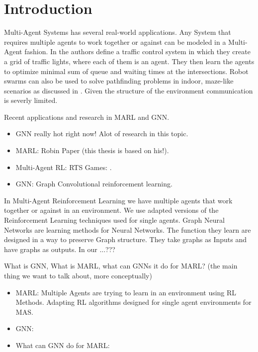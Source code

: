 
\chapter{Introduction}
Multi-Agent Systems has several real-world applications. Any System that requires multiple agents to work together or against can be modeled in a Multi-Agent fashion. In \citet{MARLTraffic2020} the authors define a traffic control system in which they create a grid of traffic lights, where each of them is an agent. They then learn the agents to optimize minimal sum of queue and waiting times at the intersections. Robot swarms can also be used to solve pathfinding problems in indoor, maze-like scenarios as discussed in \citet{SwarmPathFinding2013}. Given the structure of the environment communication is severly limited. 
\par

Recent applications and research in MARL and GNN.
\begin{itemize}[noitemsep,nolistsep]
	\item GNN really hot right now! Alot of research in this topic.
	\item MARL: Robin Paper (this thesis is based on his!). 
	\item Multi-Agent RL: RTS Games: \citet{RTSMARL2021}.
	\item GNN: Graph Convolutional reinforcement learning.
\end{itemize} \par

In Multi-Agent Reinforcement Learning we have multiple agents that work together or against in an environment. We use adapted versions of the Reinforcement Learning techniques used for single agents. Graph Neural Networks are learning methods for Neural Networks. The function they learn are designed in a way to preserve Graph structure. They take graphs as Inputs and have graphs as outputs. In our ...???

What is GNN, What is MARL, what can GNNs it do for MARL? (the main thing we want to talk about, more conceptually)
\begin{itemize}[noitemsep,nolistsep]
	\item MARL: Multiple Agents are trying to learn in an environment using RL Methods. Adapting RL algorithms designed for single agent environments for MAS.
	\item GNN: 
	\item What can GNN do for MARL:
\end{itemize} \par

